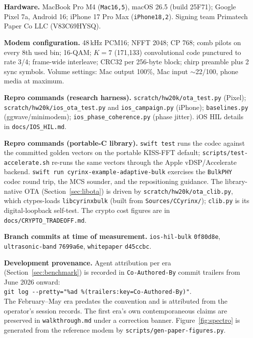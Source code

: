 \documentclass[11pt]{article}
\begin{document}
\textbf{Hardware.} MacBook Pro M4 (\texttt{Mac16,5}), macOS 26.5 (build
25F71); Google Pixel 7a, Android 16; iPhone 17 Pro Max (\texttt{iPhone18,2}).
Signing team Primatech Paper Co LLC (V83C69HYSQ).

\textbf{Modem configuration.} 48\,kHz PCM16; NFFT 2048; CP 768; comb pilots on
every 8th used bin; 16-QAM; $K{=}7$ (171,133) convolutional code punctured to
rate 3/4; frame-wide interleave; CRC32 per 256-byte block; chirp preamble plus
2 sync symbols. Volume settings: Mac output 100\%, Mac input $\sim$22/100,
phone media at maximum.

{\sloppy
\textbf{Repro commands (research harness).} \texttt{scratch/hw20k/ota\_test.py}
(Pixel); \texttt{scratch/hw20k/ios\_ota\_test.py} and \texttt{ios\_campaign.py}
(iPhone); \texttt{baselines.py} (ggwave/minimodem);
\texttt{ios\_phase\_coherence.py} (phase jitter). iOS HIL details in
\texttt{docs/IOS\_HIL.md}.\par}

\textbf{Repro commands (portable-C library).} \texttt{swift test} runs the codec
against the committed golden vectors on the portable KISS-FFT default;
\texttt{scripts/test-accelerate.sh} re-runs the same vectors through the Apple
vDSP/Accelerate backend. \texttt{swift run cyrinx-example-adaptive-bulk}
exercises the \texttt{BulkPHY} codec round trip, the MCS sounder, and the
repositioning guidance. The library-native OTA (Section~\ref{sec:libota}) is
driven by \texttt{scratch/hw20k/ota\_clib.py}, which ctypes-loads
\texttt{libcyrinxbulk} (built from \texttt{Sources/CCyrinx/}); \texttt{clib.py}
is its digital-loopback self-test. The crypto cost figures are in
\texttt{docs/CRYPTO\_TRADEOFF.md}.

\textbf{Branch commits at time of measurement.} \texttt{ios-hil-bulk}
\texttt{0f80d8e}, \texttt{ultrasonic-band} \texttt{7699a6e}, \texttt{whitepaper}
\texttt{d45ccbc}.

{\sloppy
\textbf{Development provenance.} Agent attribution per era
(Section~\ref{sec:benchmark}) is recorded in \texttt{Co-Authored-By} commit
trailers from June 2026 onward:\\
\texttt{git log -{}-pretty="\%ad \%(trailers:key=Co-Authored-By)"}.\\
The February--May era predates the convention and is attributed from the
operator's session records. The first era's own contemporaneous
claims are preserved in \texttt{walkthrough.md} under a correction banner.
Figure~\ref{fig:spectro} is generated from the reference modem by
\texttt{scripts/gen-paper-figures.py}.\par}
\end{document}
